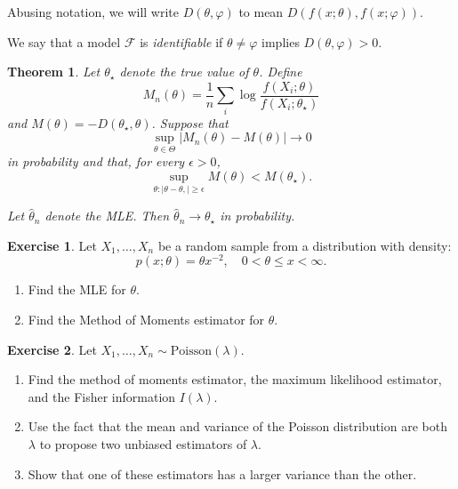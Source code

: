 \documentclass[
  openany]{book}
\newtheorem{theorem}{Theorem}[chapter]
\theoremstyle{definition}
\theoremstyle{definition}
\theoremstyle{definition}
\newtheorem{exercise}{Exercise}[chapter]
\theoremstyle{definition}
\theoremstyle{remark}
\begin{document}
Abusing notation, we will write
\(D(\theta, \varphi)\) to mean \(D(f(x;\theta), f(x;\varphi))\).

We say that a model \(\mathcal{F}\) is \emph{identifiable} if \(\theta \not= \varphi\) implies
\(D(\theta, \varphi) > 0\).

\begin{theorem}
Let \(\theta_{\star}\) denote the true value of \(\theta\). Define
\[
M_n(\theta)=\frac{1}{n} \sum_i \log \frac{f\left(X_i ; \theta\right)}{f\left(X_i ; \theta_{\star}\right)}
\]
and \(M(\theta)=-D\left(\theta_{\star}, \theta\right)\). Suppose that
\[
\sup _{\theta \in \Theta}\left|M_n(\theta)-M(\theta)\right| \to 0
\]
in probability
and that, for every \(\epsilon>0\),
\[
\sup _{\theta:|\theta-\theta,| \geq \epsilon} M(\theta)<M\left(\theta_{\star}\right) .
\]

Let \(\widehat{\theta}_n\) denote the MLE. Then \(\widehat{\theta}_n \to \theta_{\star}\) in probability.
\end{theorem}

\begin{exercise}

Let \(X_1, \ldots, X_n\) be a random sample from a distribution with density:
\[ p(x; \theta) = \theta x^{-2}, \quad 0 < \theta \leq x < \infty. \]

\begin{enumerate}
\def\labelenumi{\arabic{enumi}.}
\item
  Find the MLE for \(\theta\).
\item
  Find the Method of Moments estimator for \(\theta\).
\end{enumerate}

\end{exercise}

\begin{exercise}

Let \(X_1, \ldots, X_n \sim \text{Poisson}(\lambda)\).

\begin{enumerate}
\def\labelenumi{\arabic{enumi}.}
\item
  Find the method of moments estimator, the maximum likelihood estimator, and the Fisher information \(I(\lambda)\).
\item
  Use the fact that the mean and variance of the Poisson distribution are both \(\lambda\) to propose two unbiased estimators of \(\lambda\).
\item
  Show that one of these estimators has a larger variance than the other.
\end{enumerate}

\end{exercise}
\end{document}
